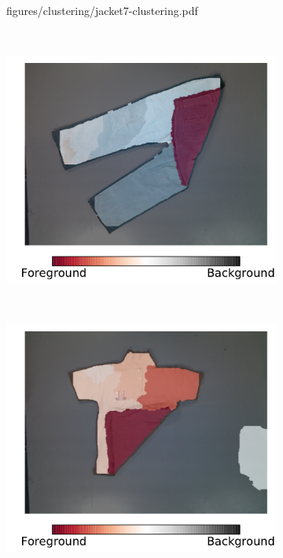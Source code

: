 \begin{figure}[htbp]
\begin{subfigure}[r]{0.49\textwidth}
    	{figures/clustering/jacket7-clustering.pdf}
	\end{subfigure} 
	~
	\begin{subfigure}[l]{0.49\textwidth}
	    \centering
    	\includegraphics[width=\textwidth]
    	{figures/clustering/pants3-clustering.pdf}
	\end{subfigure}
	~
    \begin{subfigure}[r]{0.49\textwidth}
	    \centering
    	\includegraphics[width=\textwidth]
    	{figures/clustering/polo6-clustering.pdf}

\end{subfigure}
\end{figure}

